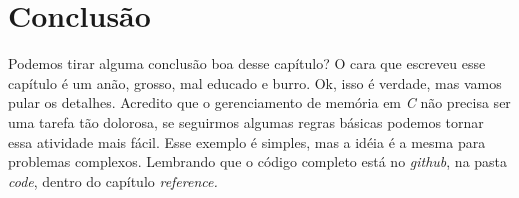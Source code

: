 \section{Conclusão}

Podemos tirar alguma conclusão boa desse capítulo? O cara que escreveu esse capítulo é um anão, grosso, mal educado e burro. Ok, isso é verdade, mas vamos pular os detalhes. 
Acredito que o gerenciamento de memória em \textit{C} não precisa ser uma tarefa tão dolorosa, se seguirmos algumas regras básicas podemos tornar essa atividade mais fácil. 
Esse exemplo é simples, mas a idéia é a mesma para problemas complexos. Lembrando que o código completo está no \textit{github}, na pasta \textit{code}, dentro do capítulo 
\textit{reference.}


